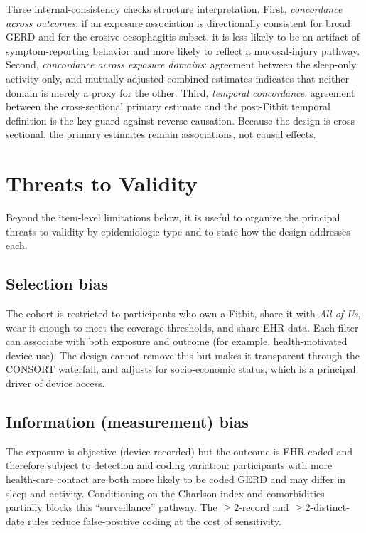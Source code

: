 \documentclass[11pt]{article}
\begin{document}
Three internal-consistency checks structure interpretation. First, \emph{concordance across outcomes}:
if an exposure association is directionally consistent for broad GERD and for the erosive oesophagitis
subset, it is less likely to be an artifact of symptom-reporting behavior and more likely to reflect a
mucosal-injury pathway. Second, \emph{concordance across exposure domains}: agreement between the
sleep-only, activity-only, and mutually-adjusted combined estimates indicates that neither domain is
merely a proxy for the other. Third, \emph{temporal concordance}: agreement between the cross-sectional
primary estimate and the post-Fitbit temporal definition is the key guard against reverse causation.
Because the design is cross-sectional, the primary estimates remain associations, not causal effects.

\section{Threats to Validity}
Beyond the item-level limitations below, it is useful to organize the principal threats to validity by
epidemiologic type and to state how the design addresses each.

\subsection{Selection bias}
The cohort is restricted to participants who own a Fitbit, share it with \emph{All of Us}, wear it
enough to meet the coverage thresholds, and share EHR data. Each filter can associate with both
exposure and outcome (for example, health-motivated device use). The design cannot remove this but
makes it transparent through the CONSORT waterfall, and adjusts for socio-economic status, which is a
principal driver of device access.

\subsection{Information (measurement) bias}
The exposure is objective (device-recorded) but the outcome is EHR-coded and therefore subject to
detection and coding variation: participants with more health-care contact are both more likely to be
coded GERD and may differ in sleep and activity. Conditioning on the Charlson index and comorbidities
partially blocks this ``surveillance'' pathway. The $\geq 2$-record and $\geq 2$-distinct-date rules
reduce false-positive coding at the cost of sensitivity.
\end{document}
